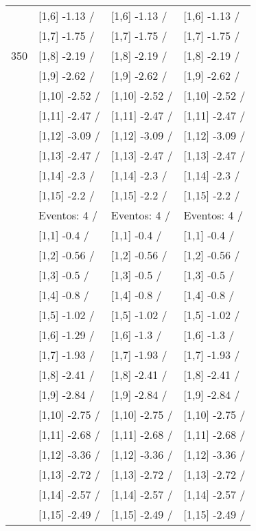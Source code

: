 \begin{table}
\begin{tabular}[t]{llll}
 & {}[1,6] -1.13  / & {}[1,6] -1.13  / & {}[1,6] -1.13  /\\
 & {}[1,7] -1.75  / & {}[1,7] -1.75  / & {}[1,7] -1.75  /\\
350 & {}[1,8] -2.19  / & {}[1,8] -2.19  / & {}[1,8] -2.19  /\\
\addlinespace
 & {}[1,9] -2.62  / & {}[1,9] -2.62  / & {}[1,9] -2.62  /\\
 & {}[1,10] -2.52  / & {}[1,10] -2.52  / & {}[1,10] -2.52  /\\
 & {}[1,11] -2.47  / & {}[1,11] -2.47  / & {}[1,11] -2.47  /\\
 & {}[1,12] -3.09  / & {}[1,12] -3.09  / & {}[1,12] -3.09  /\\
 & {}[1,13] -2.47  / & {}[1,13] -2.47  / & {}[1,13] -2.47  /\\
\addlinespace
 & {}[1,14] -2.3  / & {}[1,14] -2.3  / & {}[1,14] -2.3  /\\
 & {}[1,15] -2.2  / & {}[1,15] -2.2  / & {}[1,15] -2.2  /\\
 & Eventos:  4 / & Eventos:  4 / & Eventos:  4 /\\
 & {}[1,1] -0.4  / & {}[1,1] -0.4  / & {}[1,1] -0.4  /\\
 & {}[1,2] -0.56  / & {}[1,2] -0.56  / & {}[1,2] -0.56  /\\
\addlinespace
 & {}[1,3] -0.5  / & {}[1,3] -0.5  / & {}[1,3] -0.5  /\\
 & {}[1,4] -0.8  / & {}[1,4] -0.8  / & {}[1,4] -0.8  /\\
 & {}[1,5] -1.02  / & {}[1,5] -1.02  / & {}[1,5] -1.02  /\\
 & {}[1,6] -1.29  / & {}[1,6] -1.3  / & {}[1,6] -1.3  /\\
 & {}[1,7] -1.93  / & {}[1,7] -1.93  / & {}[1,7] -1.93  /\\
\addlinespace
500 & {}[1,8] -2.41  / & {}[1,8] -2.41  / & {}[1,8] -2.41  /\\
 & {}[1,9] -2.84  / & {}[1,9] -2.84  / & {}[1,9] -2.84  /\\
 & {}[1,10] -2.75  / & {}[1,10] -2.75  / & {}[1,10] -2.75  /\\
 & {}[1,11] -2.68  / & {}[1,11] -2.68  / & {}[1,11] -2.68  /\\
 & {}[1,12] -3.36  / & {}[1,12] -3.36  / & {}[1,12] -3.36  /\\
\addlinespace
 & {}[1,13] -2.72  / & {}[1,13] -2.72  / & {}[1,13] -2.72  /\\
 & {}[1,14] -2.57  / & {}[1,14] -2.57  / & {}[1,14] -2.57  /\\
 & {}[1,15] -2.49  / & {}[1,15] -2.49  / & {}[1,15] -2.49  /\\
\bottomrule
\end{tabular}
\end{table}
